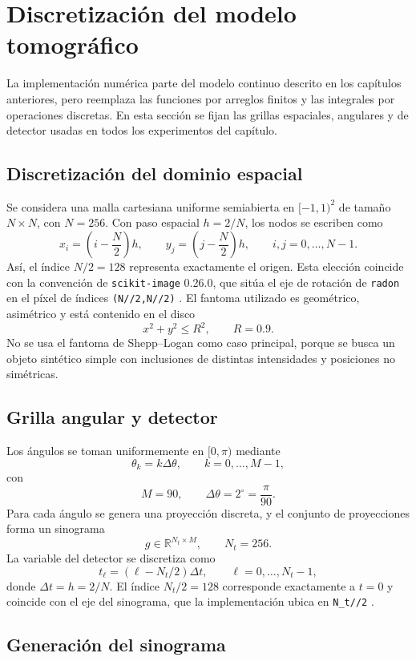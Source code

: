 \section{Discretización del modelo tomográfico}

La implementación numérica parte del modelo continuo descrito en los capítulos anteriores, pero reemplaza las funciones por arreglos finitos y las integrales por operaciones discretas. En esta sección se fijan las grillas espaciales, angulares y de detector usadas en todos los experimentos del capítulo.

\subsection*{Discretización del dominio espacial}

Se considera una malla cartesiana uniforme semiabierta en $[-1,1)^2$ de tamaño $N\times N$, con $N=256$. Con paso espacial $h=2/N$, los nodos se escriben como
\[
x_i=\left(i-\frac{N}{2}\right)h,\qquad
y_j=\left(j-\frac{N}{2}\right)h,
\qquad i,j=0,\ldots,N-1.
\]
Así, el índice $N/2=128$ representa exactamente el origen. Esta elección coincide con la convención de \texttt{scikit-image} 0.26.0, que sitúa el eje de rotación de \texttt{radon} en el píxel de índices \texttt{(N//2,N//2)} \cite{scikitimage_radon026}.
El fantoma utilizado es geométrico, asimétrico y está contenido en el disco
\[
x^2+y^2\le R^2,
\qquad R=0.9.
\]
No se usa el fantoma de Shepp--Logan como caso principal, porque se busca un objeto sintético simple con inclusiones de distintas intensidades y posiciones no simétricas.

\subsection*{Grilla angular y detector}

Los ángulos se toman uniformemente en $[0,\pi)$ mediante
\[
\theta_k=k\Delta\theta,
\qquad k=0,\ldots,M-1,
\]
con
\[
M=90,
\qquad \Delta\theta=2^\circ=\frac{\pi}{90}.
\]
Para cada ángulo se genera una proyección discreta, y el conjunto de proyecciones forma un sinograma
\[
g\in\mathbb R^{N_t\times M},
\qquad N_t=256.
\]
La variable del detector se discretiza como
\[
t_\ell=(\ell-N_t/2)\Delta t,
\qquad \ell=0,\ldots,N_t-1,
\]
donde $\Delta t=h=2/N$. El índice $N_t/2=128$ corresponde exactamente a $t=0$ y coincide con el eje del sinograma, que la implementación ubica en \texttt{N\_t//2} \cite{scikitimage_radon026}.

\subsection*{Generación del sinograma}

